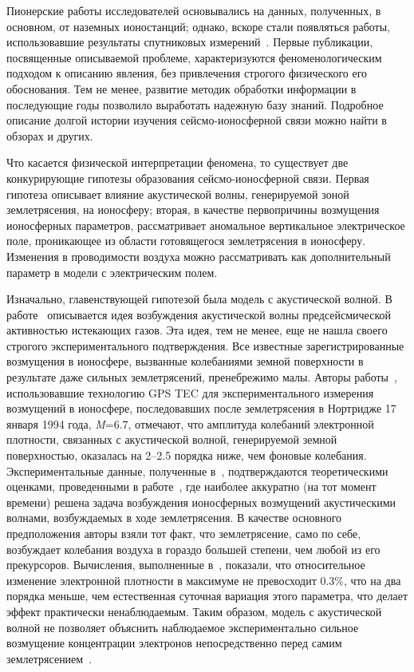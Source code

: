 \documentclass[12pt, oneside, a4paper]{article}
\begin{document}
Пионерские работы исследователей основывались на данных, полученных, в основном, от наземных ионостанций; однако, вскоре стали появляться работы, использовавшие результаты спутниковых измерений~\cite{Gokhberg:1983}. Первые публикации, посвященные описываемой проблеме, характеризуются феноменологическим подходом к описанию явления, без привлечения строгого физического его обоснования. Тем не менее, развитие методик обработки информации в последующие годы позволило выработать надежную базу знаний. Подробное описание долгой истории изучения сейсмо-ионосферной связи  можно найти в обзорах \cite{Liperovsky:1990,Gaivoronskaya:1991} и других.

Что касается физической интерпретации феномена, то существует две конкурирующие гипотезы образования сейсмо-ионосферной связи. Первая гипотеза описывает влияние акустической волны, генерируемой зоной землетрясения, на ионосферу; вторая, в качестве первопричины возмущения ионосферных параметров, рассматривает аномальное вертикальное электрическое поле, проникающее из области готовящегося землетрясения в ионосферу.  Изменения в проводимости воздуха можно рассматривать как дополнительный параметр в модели с электрическим полем. 

Изначально, главенствующей гипотезой была модель с акустической волной. В  работе~\cite{Mareev:2002} описывается идея возбуждения акустической волны предсейсмической активностью истекающих газов. Эта идея, тем не менее, еще не нашла своего строгого экспериментального подтверждения. Все известные зарегистрированные возмущения в ионосфере, вызванные колебаниями земной поверхности в результате даже сильных землетрясений, пренебрежимо малы. Авторы работы~\cite{Calais_Minster:1995}, использовавшие технологию GPS TEC для экспериментального измерения возмущений в ионосфере, последовавших после землетрясения в Нортридже 17 января 1994 года, \emph{M}=6.7, отмечают, что амплитуда колебаний электронной плотности, связанных с акустической волной, генерируемой земной поверхностью, оказалась на 2--2.5 порядка ниже, чем фоновые колебания. Экспериментальные данные, полученные в~\cite{Calais_Minster:1995}, подтверждаются теоретическими оценками, проведенными в работе~\cite{Davies_Archambeau:1998}, где наиболее аккуратно (на тот момент времени) решена задача возбуждения ионосферных возмущений акустическими волнами, возбуждаемых в ходе землетрясения. В качестве основного предположения авторы взяли тот факт, что землетрясение, само по себе, возбуждает колебания воздуха в гораздо большей степени, чем любой из его прекурсоров. Вычисления, выполненные в~\cite{Davies_Archambeau:1998}, показали, что относительное изменение электронной плотности в максимуме не превосходит $0.3\%$, что на два порядка меньше, чем естественная суточная вариация этого параметра, что делает эффект практически ненаблюдаемым. Таким образом, модель с акустической волной не позволяет объяснить наблюдаемое экспериментально сильное возмущение концентрации электронов непосредственно перед самим землетрясением~\cite{Lui:2004}. 
\end{document}
